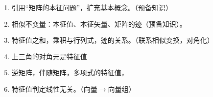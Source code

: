 

\begin{issues}
\issueDraft
\begin{enumerate}
\item 引用“矩阵的本征问题”，扩充基本概念。（预备知识）
\item 相似不变量：本征值、本征矢量、矩阵的迹（预备知识）。
\item 特征值之和，乘积与行列式，迹的关系。（联系相似变换，对角化）
\item 上三角的对角元是特征值
\item 逆矩阵，伴随矩阵，多项式的特征值，
\item 特征值判定线性无关。（向量$\rightarrow$向量组）
\end{enumerate}
\end{issues}

